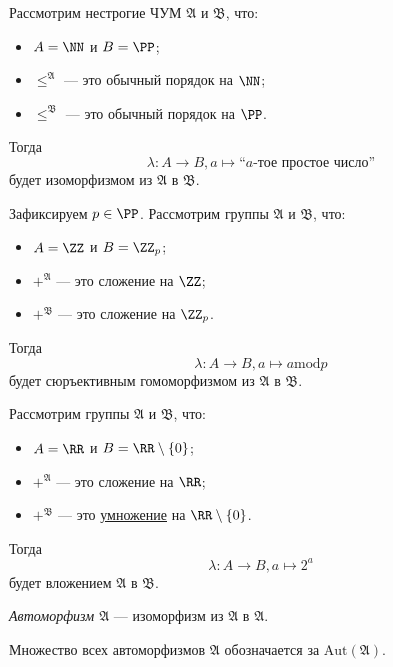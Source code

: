 \documentclass[12pt,a4paper]{article}
\newcommand{\Aut}{\ensuremath{\mathrm{Aut}}\xspace}
\begin{document}
    \begin{example}
        Рассмотрим нестрогие ЧУМ $\mathfrak{A}$ и $\mathfrak{B}$, что:
        \begin{itemize}
            \item $A = \NN$ и $B = \PP$;
            \item ${\leqslant}^\mathfrak{A}$ --- это обычный порядок на $\NN$;
            \item ${\leqslant}^\mathfrak{B}$ --- это обычный порядок на $\PP$.
        \end{itemize}
        Тогда
        \[\lambda: A \to B, a \mapsto \text{``$a$-тое простое число''}\]
        будет изоморфизмом из $\mathfrak{A}$ в $\mathfrak{B}$.
    \end{example}

    \begin{example}
        Зафиксируем $p \in \PP$. Рассмотрим группы $\mathfrak{A}$ и $\mathfrak{B}$, что:
        \begin{itemize}
            \item $A = \ZZ$ и $B = \ZZ_p$;
            \item ${+}^\mathfrak{A}$ --- это сложение на $\ZZ$;
            \item ${+}^\mathfrak{B}$ --- это сложение на $\ZZ_p$.
        \end{itemize}
        Тогда
        \[\lambda: A \to B, a \mapsto a \mathbin{\mathrm{mod}} p\]
        будет сюръективным гомоморфизмом из $\mathfrak{A}$ в $\mathfrak{B}$.
    \end{example}

    \begin{example}
        Рассмотрим группы $\mathfrak{A}$ и $\mathfrak{B}$, что:
        \begin{itemize}
            \item $A = \RR$ и $B = \RR \setminus \{0\}$;
            \item ${+}^\mathfrak{A}$ --- это сложение на $\RR$;
            \item ${+}^\mathfrak{B}$ --- это \underline{умножение} на $\RR \setminus \{0\}$.
        \end{itemize}
        Тогда
        \[\lambda: A \to B, a \mapsto 2^a\]
        будет вложением $\mathfrak{A}$ в $\mathfrak{B}$.
    \end{example}

    \begin{definition}
        \emph{Автоморфизм $\mathfrak{A}$} --- изоморфизм из $\mathfrak{A}$ в $\mathfrak{A}$.

        Множество всех автоморфизмов $\mathfrak{A}$ обозначается за $\Aut(\mathfrak{A})$.
    \end{definition}
\end{document}
